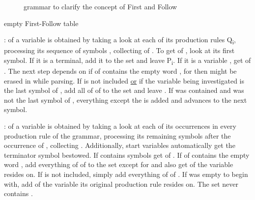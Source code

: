 \begin{figure}
	\centering
	
	

	\caption{grammar to clarify the concept of First and Follow}
	\label{fig:grammar_example_firstFollow}
\end{figure}

\begin{table}
	\centering
	\caption{empty First-Follow table}
	\label{tab:example_firstFollow_empty}
	
	
\end{table}

\underline{}:  of a variable  is obtained by taking a look at each of its production rules Q\textsubscript{i}, processing its sequence of symbols , collecting  of . To get  of , look at its first symbol. If it is a terminal, add it to the set and leave P\textsubscript{i}. If it is a variable , get  of . The next step depends on if  of  contains the empty word \straightepsilon{}, for then  might be erased in  while parsing. If \straightepsilon{} is not included \underline{or} if the variable being investigated is the last symbol of , add all of  of  to the set and leave . If \straightepsilon{} was contained and  was not the last symbol of , everything except the \straightepsilon{} is added and  advances to the next symbol.

\underline{}:  of a variable  is obtained by taking a look at each of its occurrences in every production rule  of the grammar, processing its remaining symbols after the occurrence of  , collecting  . Additionally, start variables automatically get the terminator symbol \textterminator{} bestowed. If  contains symbols get  of . If  of  contains the empty word \straightepsilon{}, add everything of  of  to the set except for \straightepsilon{} and also get  of the variable  resides on. If \straightepsilon{} is not included, simply add everything of  of . If  was empty to begin with, add  of the variable its original production rule  resides on. The  set never contains \straightepsilon{}.

